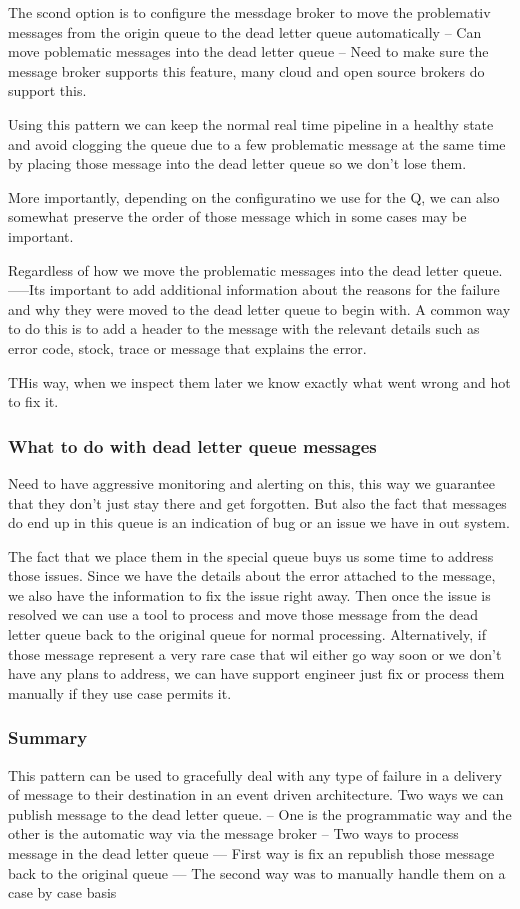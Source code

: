 \documentclass[a4paper, 11pt]{book}
\begin{document}
    The scond option is to configure the messdage broker to move the problemativ messages from the origin queue to the dead letter queue automatically
    -- Can move poblematic messages into the dead letter queue
    -- Need to make sure the message broker supports this feature, many cloud and open source brokers do support this.

    Using this pattern we can keep the normal real time pipeline in a healthy state and avoid clogging the queue due to a few problematic message at the same time by placing those message into the dead letter queue so we don't lose them.

    More importantly, depending on the configuratino we use for the Q, we can also somewhat preserve the order of those message which in some cases may be important.

    Regardless of how we move the problematic messages into the dead letter queue.
    -----Its important to add additional information about the reasons for the failure and why they were moved to the dead letter queue to begin with.
    A common way to do this is to add a header to the message with the relevant details such as error code, stock, trace or message that explains the error.

    THis way, when we inspect them later we know exactly what went wrong and hot to fix it.

    \subsubsection{What to do with dead letter queue messages}
    Need to have aggressive monitoring and alerting on this, this way we guarantee that they don't just stay there and get forgotten.
    But also the fact that messages do end up in this queue is an indication of bug or an issue we have in out system.

    The fact that we place them in the special queue buys us some time to address those issues.
    Since we have the details about the error attached to the message, we also have the information to fix the issue right away.
    Then once the issue is resolved we can use a tool to process and move those message from the dead letter queue back to the original queue for normal processing.
    Alternatively, if those message represent a very rare case that wil either go way soon or we don't have any plans to address, we can have support engineer just fix or process them manually if they use case permits it.

    \subsubsection{Summary}
    This pattern can be used to gracefully deal with any type of failure in a delivery of message to their destination in an event driven architecture.
    Two ways we can publish message to the dead letter queue.
    -- One is the programmatic way and the other is the automatic way via the message broker
    -- Two ways to process message in the dead letter queue
    --- First way is fix an republish those message back to the original queue
    --- The second way was to manually handle them on a case by case basis
\end{document}
